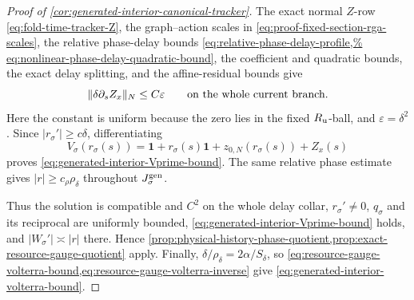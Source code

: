 \begin{proof}[Proof of
\cref{cor:generated-interior-canonical-tracker}]
The exact normal \(Z\)-row
\cref{eq:fold-time-tracker-Z}, the graph--action scales in
\cref{eq:proof-fixed-section-rga-scales}, the relative phase-delay bounds
\cref{eq:relative-phase-delay-profile,%
eq:nonlinear-phase-delay-quadratic-bound}, the coefficient and quadratic
bounds, the exact delay splitting, and the affine-residual bounds give
\[
 \|\delta\partial_sZ_x\|_N\le C\varepsilon
 \qquad\hbox{on the whole current branch}.
\]
Here the constant is uniform because the zero lies in the fixed
\(R_{\rm u}\)-ball, and \(\varepsilon=\delta^2\).
Since \(|r_\sigma'|\ge c\delta\), differentiating
\[
 V_\sigma(r_\sigma(s))
 =\mathbf1+r_\sigma(s)\mathbf1
       +z_{0,N}(r_\sigma(s))+Z_x(s)
\]
proves \cref{eq:generated-interior-Vprime-bound}.  The same relative
phase estimate gives \(|r|\ge c_\rho\rho_\delta\) throughout
\(J_\sigma^{\rm gen}\).

Thus the solution is compatible and \(C^2\) on the whole delay collar,
\(r_\sigma'\ne0\), \(q_\sigma\) and its reciprocal are uniformly bounded,
\cref{eq:generated-interior-Vprime-bound} holds, and
\(|W_\sigma'|\asymp|r|\) there.  Hence
\cref{prop:physical-history-phase-quotient,prop:exact-resource-gauge-quotient}
apply.  Finally,
\(\delta/\rho_\delta=2\alpha/S_\delta\), so
\cref{eq:resource-gauge-volterra-bound,eq:resource-gauge-volterra-inverse}
give \cref{eq:generated-interior-volterra-bound}.
\end{proof}


